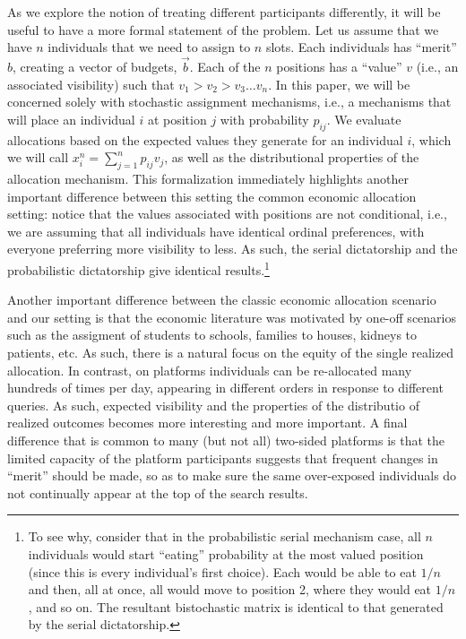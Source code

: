 \documentclass[prodmode,acmec]{acmsmall}
\begin{document}
As we explore the notion of treating different participants
differently, it will be useful to have a more formal statement of the
problem. Let us assume that we have $n$ individuals that we need to
assign to $n$ slots. Each individuals has ``merit'' $b$, creating a
vector of budgets, $\vec{b}$.  Each of the $n$ positions has a
``value'' $v$ (i.e., an associated visibility) such that $v_1 > v_2 >
v_3 \ldots v_n$. In this paper, we will be concerned solely with
stochastic assignment mechanisms, i.e., a mechanisms that will place
an individual $i$ at position $j$ with probability $p_{ij}$. We
evaluate allocations based on the expected values they generate for an
individual $i$, which we will call $x^n_i = \sum_{j=1}^n p_{ij}v_j$,
as well as the distributional properties of the allocation
mechanism. This formalization immediately highlights another important
difference between this setting the common economic allocation
setting: notice that the values associated with positions are not
conditional, i.e., we are assuming that all individuals have identical
ordinal preferences, with everyone preferring more visibility to
less. As such, the serial dictatorship and the probabilistic
dictatorship give identical results.\footnote{To see why, consider
  that in the probabilistic serial mechanism case, all $n$ individuals
  would start ``eating'' probability at the most valued position
  (since this is every individual's first choice). Each would be able
  to eat $1/n$ and then, all at once, all would move to position 2,
  where they would eat $1/n$, and so on. The resultant bistochastic
  matrix is identical to that generated by the serial dictatorship.}

Another important difference between the classic economic allocation
scenario and our setting is that the economic literature was motivated
by one-off scenarios such as the assigment of students to schools,
families to houses, kidneys to patients, etc. As such, there is a
natural focus on the equity of the single realized allocation. In
contrast, on platforms individuals can be re-allocated many hundreds
of times per day, appearing in different orders in response to
different queries. As such, expected visibility and the properties of
the distributio of realized outcomes becomes more interesting and more
important.  A final difference that is common to many (but not all)
two-sided platforms is that the limited capacity of the platform
participants suggests that frequent changes in ``merit'' should be
made, so as to make sure the same over-exposed individuals do not
continually appear at the top of the search results.
\end{document}
